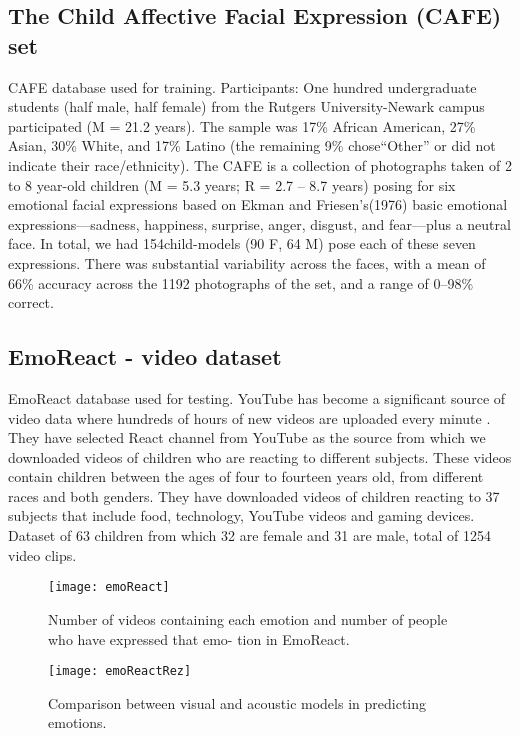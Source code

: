 \documentclass[runningheads,a4paper,11pt]{report}
\begin{document}
\begin{itemize}
{\subsection{The Child Affective Facial Expression (CAFE) set}}
CAFE database used for training.
Participants: One hundred undergraduate students (half male, half female) from the Rutgers University-Newark campus participated (M =
21.2 years). The sample was 17\% African
American, 27\% Asian, 30\% White, and 17\% Latino (the remaining 9\% chose“Other” or did not indicate their race/ethnicity).
\cite{LoBue14}
The CAFE is a collection of photographs taken of 2 to 8 year-old children (M = 5.3 years; R = 2.7 – 8.7 years) posing for six emotional facial expressions based on Ekman and Friesen’s(1976) basic emotional expressions—sadness, happiness, surprise, anger, disgust, and fear—plus a neutral face. 
In total, we had 154child-models (90 F, 64 M) pose each of these seven expressions. There was substantial variability across the faces, with a mean of 66\% accuracy across the 1192 photographs of the set, and a range of 0–98\% correct.

{\subsection{EmoReact - video dataset}}
EmoReact database used for testing.
YouTube has become a significant source of video data where hundreds of hours of new videos are uploaded every minute . They have selected React channel from YouTube as the source from which we downloaded videos of children who are reacting to different subjects. These videos contain children between the ages of four to fourteen years old, from
different races and both genders. They have downloaded videos of children reacting to 37 subjects that include food, technology, YouTube
videos and gaming devices. 
Dataset of 63 children from which 32 are female and 31 are male, total of 1254 video clips.\cite{Nojavanasghari16}

 \begin{figure}
    	\centerline{\texttt{[image: emoReact]}}
   		\caption{Number of videos containing each emotion
and number of people who have expressed that emo-
tion in EmoReact.\cite{Nojavanasghari16}}
    \end{figure}
   

 \begin{figure}
    	\centerline{\texttt{[image: emoReactRez]}}
   		\caption{Comparison between visual and acoustic models in predicting emotions.\cite{Nojavanasghari16}}
    \end{figure}
   

\end{itemize}
\end{document}
